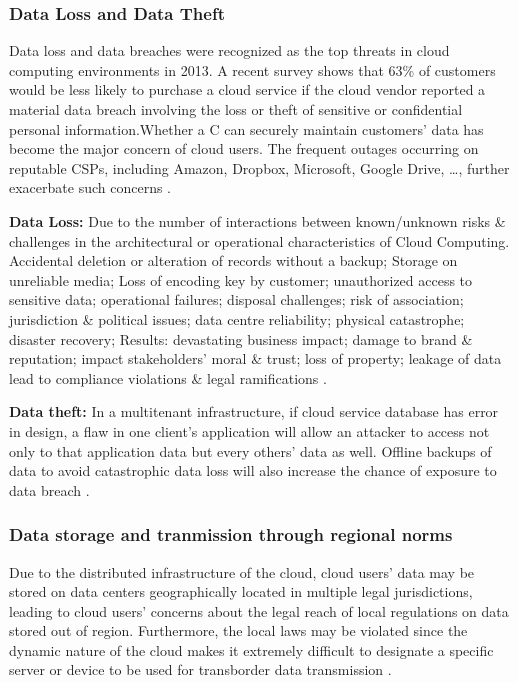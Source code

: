 \documentclass[twocolumn]{article}
\begin{document}
\subsubsection{Data Loss and Data Theft}
Data loss and data breaches were recognized as the top threats in cloud computing environments in 2013. A recent survey shows that 63\% of customers would be less likely to purchase a cloud service if the cloud vendor reported a material data breach involving the loss or theft of sensitive or confidential personal information.Whether a C can securely maintain customers’ data has become the major concern of cloud users. The frequent outages occurring on reputable CSPs, including Amazon, Dropbox, Microsoft, Google Drive, \dots, further exacerbate such concerns \cite{liu2015survey}.

\textbf{Data Loss:} Due to the number of interactions between known/unknown risks \& challenges in the architectural or operational characteristics of Cloud Computing. Accidental deletion or alteration of records without a backup; Storage on unreliable media; Loss of encoding key by customer; unauthorized access to sensitive data; operational failures; disposal challenges; risk of association; jurisdiction \& political issues; data centre reliability; physical catastrophe; disaster recovery; Results: devastating business impact; damage to brand \& reputation; impact stakeholders’ moral \& trust; loss of property; leakage of data lead to compliance violations \& legal ramifications \cite{ahmad2017cloud}.

\textbf{Data theft:} In a multitenant infrastructure, if cloud service database has error in design, a flaw in one client’s application will allow an attacker to access not only to that application data but every others’ data as well. Offline backups of data to avoid catastrophic data loss will also increase the chance of exposure to data breach \cite{ahmad2017cloud}.

\subsubsection{Data storage and tranmission through regional norms}
Due to the distributed infrastructure of the cloud, cloud users’ data may be stored on data centers geographically located in multiple legal jurisdictions, leading to cloud users’ concerns about the legal reach of local regulations on data stored out of region. Furthermore, the local laws may be violated since the dynamic nature of the cloud makes it extremely difficult to designate a specific server or device to be used for transborder data transmission \cite{liu2015survey}.
\end{document}
